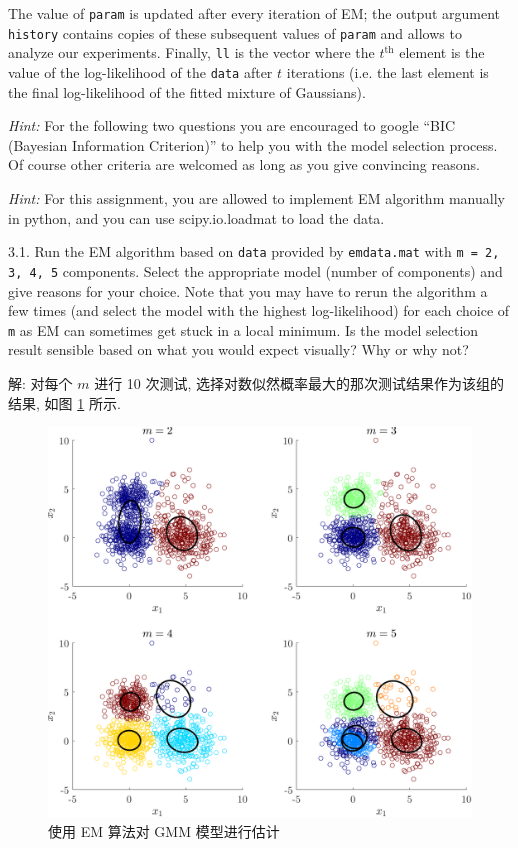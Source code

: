 \documentclass{article}
\begin{document}
The value of \verb|param| is updated after every iteration of EM; the output argument \verb|history| contains copies of these subsequent values of \verb|param| and allows to analyze our experiments. Finally, \verb|ll| is the vector where the $t^{\mathrm{th}}$ element is the value of the log-likelihood of the \verb|data| after $t$ iterations (i.e. the last element is the final log-likelihood of the fitted mixture of Gaussians).

\emph{Hint:} For the following two questions you are encouraged to google ``BIC (Bayesian Information Criterion)'' to help you with the model selection process. Of course other criteria are welcomed as long as you give convincing reasons.

\emph{Hint:} For this assignment, you are allowed to implement EM algorithm manually in python, and you can use scipy.io.loadmat to load the data.

3.1. Run the EM algorithm based on \verb|data| provided by \verb|emdata.mat| with \verb|m = 2, 3, 4, 5| components. Select the appropriate model (number of components) and give reasons for your choice. Note that you may have to rerun the algorithm a few times (and select the model with the highest log-likelihood) for each choice of \verb|m| as EM can sometimes get stuck in a local minimum. Is the model selection result sensible based on what you would expect visually? Why or why not?

解: 对每个 $m$ 进行 10 次测试, 选择对数似然概率最大的那次测试结果作为该组的结果, 如图 \ref{fig:gmmem1} 所示. 

\begin{figure}[htbp]
  \centering
  \includegraphics[width=6in]{gmmem-1.pdf}
  \caption{使用 EM 算法对 GMM 模型进行估计}
  \label{fig:gmmem1}
\end{figure}
\end{document}
